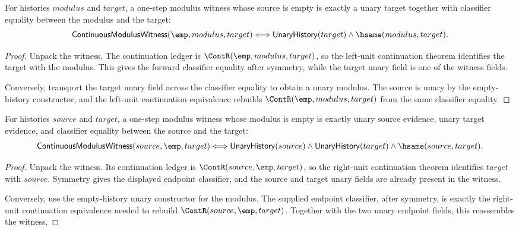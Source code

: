 \begin{theorem}
\label{thm:continuous-modulus-witness-empty-source-iff}
For histories $modulus$ and $target$, a one-step modulus witness whose source
is empty is exactly a unary target together with classifier equality between
the modulus and the target:
$$
\mathsf{ContinuousModulusWitness}(\emp,modulus,target)
\Longleftrightarrow
\mathsf{UnaryHistory}(target)\land\hsame(modulus,target).
$$
\end{theorem}
\begin{proof}
Unpack the witness. The continuation ledger is
$\ContR(\emp,modulus,target)$, so the left-unit continuation theorem identifies
the target with the modulus. This gives the forward classifier equality after
symmetry, while the target unary field is one of the witness fields.

Conversely, transport the target unary field across the classifier equality to
obtain a unary modulus. The source is unary by the empty-history constructor,
and the left-unit continuation equivalence rebuilds
$\ContR(\emp,modulus,target)$ from the same classifier equality.
\end{proof}

\begin{theorem}
\label{thm:continuous-modulus-witness-empty-modulus-iff}
For histories $source$ and $target$, a one-step modulus witness whose modulus
is empty is exactly unary source evidence, unary target evidence, and classifier
equality between the source and the target:
$$
\mathsf{ContinuousModulusWitness}(source,\emp,target)
\Longleftrightarrow
\mathsf{UnaryHistory}(source)\land
\mathsf{UnaryHistory}(target)\land
\hsame(source,target).
$$
\end{theorem}
\begin{proof}
Unpack the witness. Its continuation ledger is
$\ContR(source,\emp,target)$, so the right-unit continuation theorem identifies
$target$ with $source$. Symmetry gives the displayed endpoint classifier, and
the source and target unary fields are already present in the witness.

Conversely, use the empty-history unary constructor for the modulus. The
supplied endpoint classifier, after symmetry, is exactly the right-unit
continuation equivalence needed to rebuild $\ContR(source,\emp,target)$.
Together with the two unary endpoint fields, this reassembles the witness.
\end{proof}

